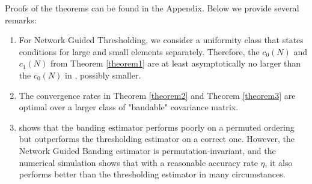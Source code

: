 Proofs of the theorems can be found in the Appendix. Below we provide several remarks:
\begin{enumerate}
    \item For Network Guided Thresholding, we consider a uniformity class that states conditions for large and small elements separately. Therefore, the $c_0(N)$ and $c_1(N)$ from Theorem \autoref{theorem1} are at least asymptotically no larger than the $c_0(N)$ in \cite{bickel2008covariance}, possibly smaller.  
    
    \item The convergence rates in Theorem \autoref{theorem2} and Theorem \autoref{theorem3} are optimal over a larger class of "bandable" covariance matrix. 
    
    \item \cite{bickel2008covariance} shows that the banding estimator performs poorly on a permuted ordering but outperforms the thresholding estimator on a correct one. However, the Network Guided Banding estimator is permutation-invariant, and the numerical simulation shows that with a reasonable accuracy rate $\eta$, it also performs better than the thresholding estimator in many circumstances. 
\end{enumerate}
